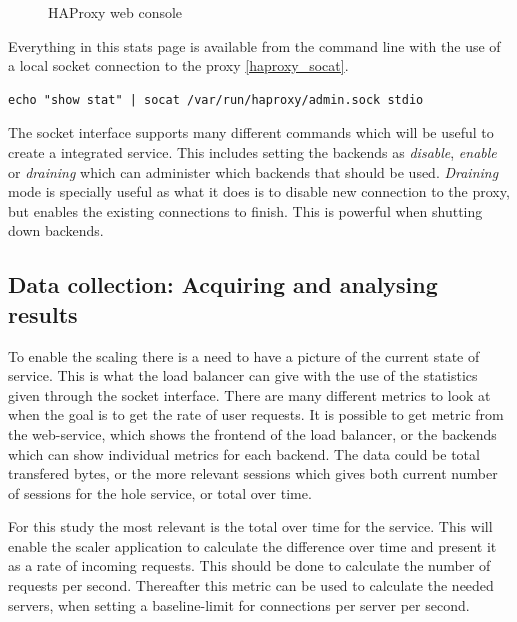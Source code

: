 \begin{figure}[htp]
\centering
{}
\caption{\label{fig:haproxy_web_stats}HAProxy web console}
\end{figure}

Everything in this stats page is available from the command line with the use
of a local socket connection to the proxy \ref{haproxy_socat}.

\begin{lstlisting}[label=haproxy_socat,caption=Getting statistics from HAProxy
with sockets,numbers=none]
echo "show stat" | socat /var/run/haproxy/admin.sock stdio
\end{lstlisting}

The socket interface supports many different commands which will be useful to
create a integrated service. This includes setting the backends as
\textit{disable}, \textit{enable} or \textit{draining} which can administer
which backends that should be used. \textit{Draining} mode is specially useful
as what it does is to disable new connection to the proxy, but enables the
existing connections to finish. This is powerful when shutting down backends.

\subsection{Data collection: Acquiring and analysing results}
To enable the scaling there is a need to have a picture of the current state of
service. This is what the load balancer can give with the use of the statistics
given through the socket interface. There are many different metrics to look at
when the goal is to get the rate of user requests. It is possible to get metric
from the web-service, which shows the frontend of the load balancer, or the
backends which can show individual metrics for each backend. The data could be
total transfered bytes, or the more relevant sessions which gives both current
number of sessions for the hole service, or total over time.

For this study the most relevant is the total over time for the service. This
will enable the scaler application to calculate the difference over time and
present it as a rate of incoming requests. This should be done to calculate the
number of requests per second. Thereafter this metric can be used to calculate
the needed servers, when setting a baseline-limit for connections per server
per second.

